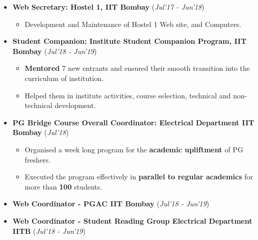 \documentclass[10pt]{article}
\begin{document}
\colorbox{bl}{}

\begin{itemize}[leftmargin=0.4cm]
\vspace{-0.15cm}
\item \textbf {Web Secretary: Hostel 1, IIT Bombay} 
\hfill{(\textit{Jul'17 - Jun'18})}\\[-0.6cm]
    \begin{itemize}
	\item Development and Maintenance of Hostel 1 Web site, and Computers.
	\end{itemize}
	\vspace{-0.25cm}
	
	
\item \textbf{Student Companion: Institute Student Companion Program, IIT Bombay}
\hfill{(\textit{Jul'18 - Jun'19})}\\[-0.6cm]
    \begin{itemize}
			\item \textbf{Mentored} 7 new entrants and ensured their smooth transition into the curriculum of institution.\vspace{-0.1cm}
            \item Helped them in institute activities, course selection, technical and non-technical development.
		\end{itemize}
		\vspace{-0.25cm}
	
\item \textbf{PG Bridge Course Overall Coordinator: Electrical Department IIT Bombay}
\hfill{(\textit{Jul'18})}\\[-0.6cm]
    \begin{itemize}
            \item Organised a week long program for the \textbf{academic upliftment} of PG freshers.\vspace{-0.1cm}
            \item Executed the program effectively in \textbf{parallel to regular academics} for more than \textbf{100} students.
		\end{itemize}
		\vspace{-0.25cm}	

\item \textbf{Web Coordinator - PGAC IIT Bombay}
\hfill{(\textit{Jul'18 - Jun'19})}\\[-0.6cm]


\item \textbf{Web Coordinator - Student Reading Group Electrical Department IITB} \hfill{(\textit{Jul'18 - Jun'19})}\vspace{-0.2cm}
    	
\end{itemize}
\end{document}
